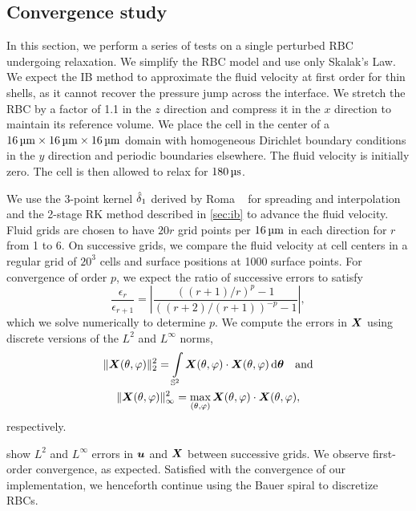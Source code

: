 \subsection{Convergence study}\label{sec:convergence}

In this section, we perform a series of tests on a single perturbed RBC undergoing relaxation. We simplify the RBC
model and use only Skalak's Law. We expect the IB method to approximate the fluid velocity at first order for thin
shells, as it cannot recover the pressure jump across the interface. We stretch the RBC by a factor of 1.1 in the
$z$ direction and compress it in the $x$ direction to maintain its reference volume. We place the cell in the
center of a $16\um\times16\um\times16\um$ domain with homogeneous Dirichlet boundary conditions in the $y$
direction and periodic boundaries elsewhere. The fluid velocity is initially zero. The cell is then allowed to
relax for $180\us$.

We use the 3-point kernel $\hat{\delta}_1$ derived by Roma ~\cite{Roma:1999tx} for spreading and
interpolation and the 2-stage RK method described in \cref{sec:ib} to advance the fluid velocity. Fluid grids are
chosen to have $20r$ grid points per $16\um$ in each direction for $r$ from 1 to 6. On successive grids, we
compare the fluid velocity at cell centers in a regular grid of $20^3$ cells and surface positions at 1000 surface
points. For convergence of order $p$, we expect the ratio of successive errors to satisfy
\begin{equation}
    \frac{\epsilon_r}{\epsilon_{r+1}} = \left|\frac{{((r+1)/r)}^p-1}{{((r+2)/(r+1))}^{-p}-1}\right|,
\end{equation}
which we solve numerically to determine $p$. We compute the errors in $\boldsymbol{X}$ using discrete versions of the $L^2$
and $L^\infty$ norms,
\begin{gather}
    \|\X(\theta, \varphi)\|_2^2 =
    \int\limits_{\sphere} \X(\theta, \varphi)\cdot\X(\theta, \varphi) \d\qs \quad\text{and} \\
    \|\X(\theta, \varphi)\|_\infty^2 =
    \max_{(\theta, \varphi)} \X(\theta, \varphi)\cdot\X(\theta, \varphi),
\end{gather}
respectively.

 show $L^2$ and $L^\infty$ errors in $\boldsymbol{u}$ and $\boldsymbol{X}$ between successive grids.
We observe first-order convergence, as expected. Satisfied with the convergence of our implementation, we
henceforth continue using the Bauer spiral to discretize RBCs.

